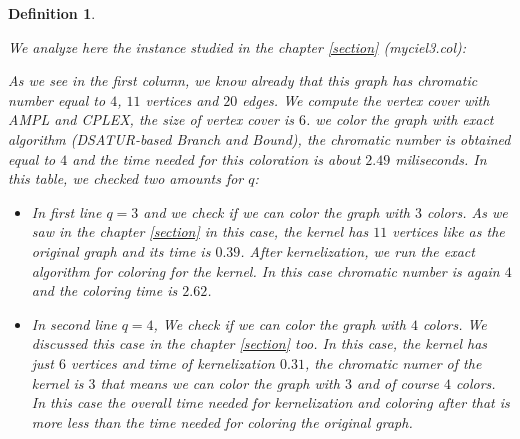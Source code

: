 \documentclass[12pt]{article}
\theoremstyle{slplain}
\newtheorem{defi}{Definition}
\begin{document}
\begin{defi}
\begin{enumerate}
We analyze here the instance studied in the chapter \ref{section} (myciel3.col):
     
As we see in the first column, we know already that this graph has chromatic number equal to $4$, $11$ vertices and $20$ edges. We compute the vertex cover with AMPL and CPLEX, the size of vertex cover is $6$. we color the graph with exact algorithm (DSATUR-based Branch and Bound), the chromatic number is obtained equal to $4$ and the time needed for this coloration is about $2.49$ miliseconds.  In this table, we checked two amounts for $q$: 
\begin{itemize}
\item In first line $q = 3$ and we check if we can color the graph with $3$ colors. As we saw in the chapter \ref{section} in this case, the kernel has $11$ vertices like as the original graph and its time is $0.39$. After kernelization, we run the exact algorithm for coloring for the kernel. In this case chromatic number is again $4$ and the coloring time is $2.62$. 

\item In second line $q = 4$, We check if we can color the graph with $4$ colors. We discussed this case in the chapter \ref{section} too. In this case, the kernel has just $6$ vertices and time of kernelization $0.31$, the chromatic numer of the kernel is $3$ that means we can color the graph with $3$ and of course $4$ colors. In this case the overall time needed for kernelization and coloring after that is more less than the time needed for coloring the original graph.
\end{itemize}

\newpage



\end{enumerate}
\end{defi}
\end{document}
